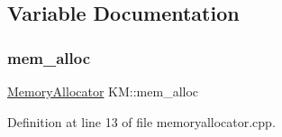 \subsection{Variable Documentation}
\mbox{\label{namespace_k_m_ab71afb37d9950edf604f583b657905aa}} 
\subsubsection{\texorpdfstring{mem\+\_\+alloc}{mem\_alloc}}
{\footnotesize\ttfamily \hyperlink{class_k_m_1_1_memory_allocator}{Memory\+Allocator} K\+M\+::mem\+\_\+alloc}



Definition at line 13 of file memoryallocator.\+cpp.

